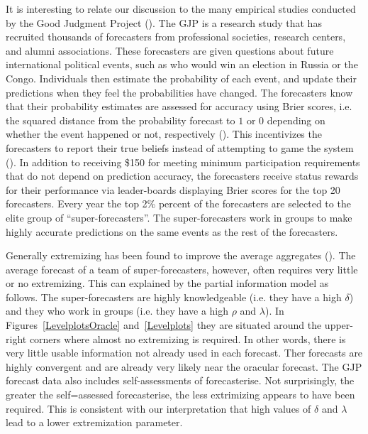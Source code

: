 \documentclass[11pt]{article}
\theoremstyle{definition}
\theoremstyle{definition}
\begin{document}
It is interesting to relate our discussion to the many empirical 
studies conducted by the Good Judgment Project %
(\citealt{mellers2014psychological, ungar2012good}).  The GJP is 
a research study that has recruited thousands of forecasters 
from professional societies, research centers, and alumni associations. 
These forecasters are given questions about future international 
political events, such as who would win an election in Russia or 
the Congo.  Individuals then estimate the probability of each event, and 
update their predictions when they feel the probabilities have changed.  
The forecasters know that their probability estimates are assessed 
for accuracy using Brier scores, i.e. the squared distance from the  
probability forecast to $1$ or $0$ depending on whether the event 
happened or not, respectively (\citealt{Brier}).  This incentivizes 
the forecasters to report their true beliefs instead of attempting 
to game the system (\citealt{winkler1968good}).  In addition to receiving 
\$150 for meeting minimum participation requirements that do not depend 
on prediction accuracy, the forecasters receive status rewards for 
their performance via leader-boards displaying Brier scores for the 
top 20 forecasters.  Every year the top 2\% percent of the forecasters 
are selected to the elite group of ``super-forecasters''.  The 
super-forecasters work in groups to make highly accurate predictions 
on the same events as the rest of the forecasters. 

Generally extremizing has been found to improve the average 
aggregates (\citet{mellers2014psychological}).  The average 
forecast of a team of super-forecasters, however, often 
requires very little or no extremizing.  This can explained by 
the partial information model as follows.  The super-forecasters 
are highly knowledgeable (i.e. they have a high $\delta$) 
and they who work in groups (i.e. they have a high $\rho$ and 
$\lambda$).  In Figures~\ref{LevelplotsOracle} and~\ref{Levelplots} 
they are situated around the upper-right corners where almost 
no extremizing is required.  In other words, there is very little
usable information not already used in each forecast.  Ther
forecasts are highly convergent and are already very likely near
the oracular forecast.  The GJP forecast data also includes 
self-assessments of forecasterise.  Not surprisingly, the greater
the self=assessed forecasterise, the less extrimizing appears to 
have been required.  This is consistent with our interpretation
that high values of $\delta$ and $\lambda$ lead to a lower
extremization parameter.
\end{document}
